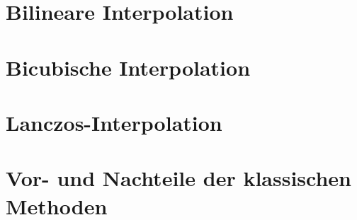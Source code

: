 \section{Bilineare Interpolation}
\section{Bicubische Interpolation}
\section{Lanczos-Interpolation}
\section{Vor- und Nachteile der klassischen Methoden}
